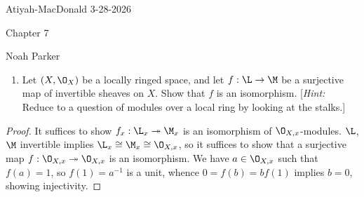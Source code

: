 \documentclass[12pt]{amsart}
\begin{document}
{Atiyah-MacDonald} \hfill {3-28-2026}

\bigskip\bigskip

\begin{center}

{\sc Chapter 7}

\end{center}

\begin{center}

  {Noah Parker} %
    
\end{center}

\bigskip

\begin{enumerate}
  \item[7.1.] {
      Let $(X,\O_X)$ be a locally ringed space, and let $f:\L\to \M$ be a surjective map of invertible sheaves on $X$.
      Show that $f$ is an isomorphism.
      [\emph{Hint:} Reduce to a question of modules over a local ring by looking at the stalks.]
    }
\end{enumerate}

\begin{proof}
  It suffices to show $f_x:\L_x\twoheadrightarrow \M_x$ is an isomorphism of $\O_{X,x}$-modules.
  $\L$, $\M$ invertible implies $\L_x\cong \M_x\cong \O_{X,x}$, so it suffices to show that a surjective map $f:\O_{X,x}\twoheadrightarrow\O_{X,x}$ is an isomorphism.
  We have $a\in \O_{X,x}$ such that $f(a) = 1$, so $f(1)=a^{-1}$ is a unit, whence $0=f(b)=bf(1)$ implies $b=0$, showing injectivity.
\end{proof}

% 
\end{document}
